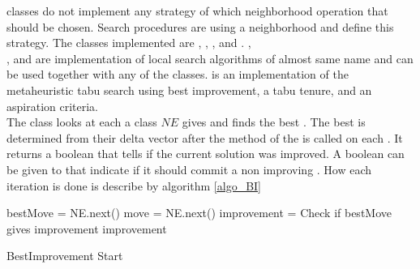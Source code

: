  classes do not implement any strategy of which neighborhood operation that should be chosen. 
Search procedures are using a neighborhood and define this strategy. The classes implemented 
are , , , and . 
, \\ , and  are implementation of local search 
algorithms of almost same name and can be used together with any of the  classes. 
 is an implementation of the metaheuristic tabu search using best improvement, a tabu tenure, and 
an aspiration criteria. \medskip \\
The class  looks at each  a  class $NE$ gives and finds the 
best . The best  is determined from their delta vector after the method  
of the  is called on each . It returns a boolean that tells if the current solution was 
improved. A boolean can be given to  that indicate if it should commit a non improving 
. How each iteration is done is describe by algorithm \ref{algo_BI} \\ 
\IncMargin{1em}
\begin{algorithm}[H]

\algdata
{}
\BlankLine
 bestMove = NE.next() \;
 move = NE.next() \;
\bool improvement = Check if bestMove gives improvement \;
 \;
\Return improvement \;

\caption{BestImprovement Start} \label{algo_BI} 
\end{algorithm} \noindent

